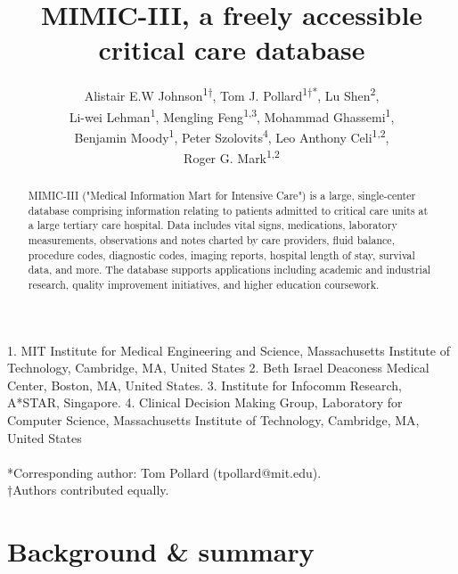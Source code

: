 \documentclass[english]{article}
\begin{document}
\title{MIMIC-III, a freely accessible critical care database}

\author{
Alistair E.W Johnson\textsuperscript{1{†}},
Tom J. Pollard\textsuperscript{1{†}{*}},
Lu Shen\textsuperscript{2}, \\
Li-wei Lehman\textsuperscript{1},
Mengling Feng\textsuperscript{1,3},
Mohammad Ghassemi\textsuperscript{1}, \\
Benjamin Moody\textsuperscript{1},
Peter Szolovits\textsuperscript{4},
Leo Anthony Celi\textsuperscript{1,2}, \\
Roger G. Mark\textsuperscript{1,2}
}

\maketitle
\thispagestyle{fancy}

1. MIT Institute for Medical Engineering and Science, Massachusetts Institute of Technology, Cambridge, MA, United States 2. Beth Israel Deaconess Medical Center, Boston, MA, United States. 3. Institute for Infocomm Research, A*STAR, Singapore. 4. Clinical Decision Making Group, Laboratory for Computer Science, Massachusetts Institute of Technology, Cambridge, MA, United States \\ 
\\
{*}Corresponding author: Tom Pollard (tpollard@mit.edu). \\
{†}Authors contributed equally.

\begin{abstract} %
MIMIC-III ("Medical Information Mart for Intensive Care") is a large, single-center database comprising information relating to patients admitted to critical care units at a large tertiary care hospital. Data includes vital signs, medications, laboratory measurements, observations and notes charted by care providers, fluid balance, procedure codes, diagnostic codes, imaging reports, hospital length of stay, survival data, and more. The database supports applications including academic and industrial research, quality improvement initiatives, and higher education coursework.
\end{abstract}

\section*{Background \& summary} %
\end{document}
